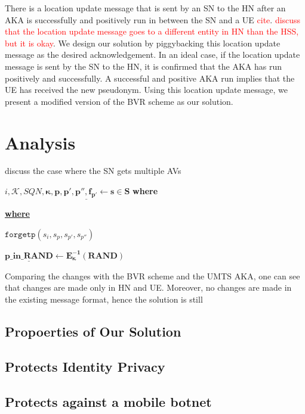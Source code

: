 \documentclass{llncs} %
\begin{document}
There is a location update message that is sent by an SN to the HN after an AKA is successfully and positively run in between the SN and a UE \textcolor{red}{cite}. \textcolor{red}{discuss that the location update message goes to a different entity in HN than the HSS, but it is okay}. We design our solution by piggybacking this location update message as the desired acknowledgement. In an ideal case, if the location update message is sent by the SN to the HN, it is confirmed that the AKA has run positively and successfully. A successful and positive AKA run implies that the  UE has received the new pseudonym. Using this location update message, we present a modified version of the BVR scheme as our solution.




\section{Analysis}
discuss the case where the SN gets multiple AVs

$i,\mathcal{K},SQN, \pmb{\kappa,p,p',\underline{p'',f_{p'}} \leftarrow s \in S}$ \textbf{where} 





\underline{ \textbf{where} }


\underline{}

$\texttt{forgetp$\left(s_{i},s_{p},s_{p'},s_{p''}\right)$}$

$\pmb{ \underline{p\_in\_RAND} \leftarrow E_{\kappa}^{-1}(RAND)}$

Comparing the changes with the BVR scheme and the UMTS AKA, one can see that changes are made only in HN and UE. Moreover, no changes are made in the existing message format, hence the solution is still
\subsection{Propoerties of Our Solution}
\subsection{Protects Identity Privacy}
\subsection{Protects against a mobile botnet}
\end{document}
